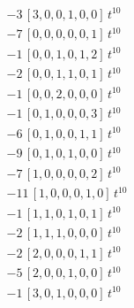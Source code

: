 \begin{align*}
-3\,[3,0,0,1,0,0]\,t^{10} \\
-7\,[0,0,0,0,0,1]\,t^{10} \\
-1\,[0,0,1,0,1,2]\,t^{10} \\
-2\,[0,0,1,1,0,1]\,t^{10} \\
-1\,[0,0,2,0,0,0]\,t^{10} \\
-1\,[0,1,0,0,0,3]\,t^{10} \\
-6\,[0,1,0,0,1,1]\,t^{10} \\
-9\,[0,1,0,1,0,0]\,t^{10} \\
-7\,[1,0,0,0,0,2]\,t^{10} \\
-11\,[1,0,0,0,1,0]\,t^{10} \\
-1\,[1,1,0,1,0,1]\,t^{10} \\
-2\,[1,1,1,0,0,0]\,t^{10} \\
-2\,[2,0,0,0,1,1]\,t^{10} \\
-5\,[2,0,0,1,0,0]\,t^{10} \\
-1\,[3,0,1,0,0,0]\,t^{10}
\end{align*}
